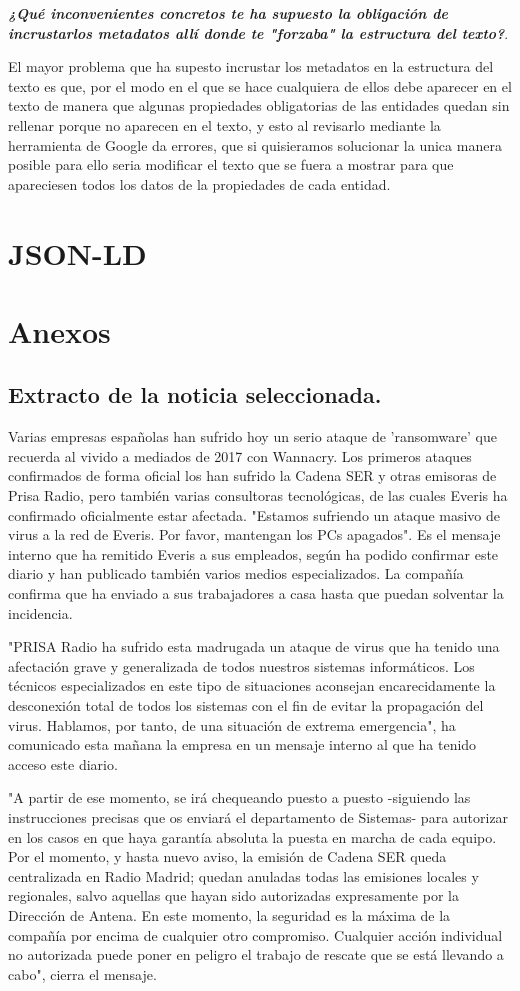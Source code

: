 \documentclass{llncs}   %
\begin{document}
\textbf{\textit{¿Qué inconvenientes concretos te ha supuesto la obligación de incrustarlos metadatos allí donde te "forzaba" 
la estructura del texto?}}.

El mayor problema que ha supesto incrustar los metadatos en la estructura del texto es que, por el modo 
en el que se hace cualquiera de ellos debe aparecer en el texto de manera que algunas propiedades obligatorias de las entidades
quedan sin rellenar porque no aparecen en el texto, y esto al revisarlo mediante la herramienta de Google da errores, 
que si quisieramos solucionar la unica manera posible para ello seria modificar el texto que se fuera a mostrar para que 
apareciesen todos los datos de la propiedades de cada entidad.

\section{JSON-LD}

\section{Anexos}
\subsection{Extracto de la noticia seleccionada.}\label{noticia}
Varias empresas españolas han sufrido hoy un serio ataque de 'ransomware' que recuerda al 
vivido a mediados de 2017 con Wannacry. Los primeros ataques confirmados de forma oficial 
los han sufrido la Cadena SER y otras emisoras de Prisa Radio, pero también varias consultoras 
tecnológicas, de las cuales Everis ha confirmado oficialmente estar afectada. "Estamos sufriendo 
un ataque masivo de virus a la red de Everis. Por favor, mantengan los PCs apagados". Es el 
mensaje interno que ha remitido Everis a sus empleados, según ha podido confirmar este diario 
y han publicado también varios medios especializados. La compañía confirma que ha enviado a sus 
trabajadores a casa hasta que puedan solventar la incidencia.

"PRISA Radio ha sufrido esta madrugada un ataque de virus que ha tenido una afectación grave y 
generalizada de todos nuestros sistemas informáticos. Los técnicos especializados en este tipo 
de situaciones aconsejan encarecidamente la desconexión total de todos los sistemas con el fin 
de evitar la propagación del virus. Hablamos, por tanto, de una situación de extrema emergencia", 
ha comunicado esta mañana la empresa en un mensaje interno al que ha tenido acceso este diario.

"A partir de ese momento, se irá chequeando puesto a puesto -siguiendo las instrucciones precisas 
que os enviará el departamento de Sistemas- para autorizar en los casos en que haya garantía 
absoluta la puesta en marcha de cada equipo. Por el momento, y hasta nuevo aviso, la emisión de 
Cadena SER queda centralizada en Radio Madrid; quedan anuladas todas las emisiones locales y 
regionales, salvo aquellas que hayan sido autorizadas expresamente por la Dirección de Antena. 
En este momento, la seguridad es la máxima de la compañía por encima de cualquier otro compromiso. 
Cualquier acción individual no autorizada puede poner en peligro el trabajo de rescate que se está 
llevando a cabo", cierra el mensaje.
\end{document}
